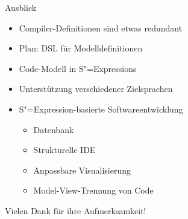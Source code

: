 \documentclass{beamer}
\newcommand{\pfeil}{\item[$\Rightarrow$]}
\newcommand{\sexp}{S"=Expression}
\newcommand{\sexps}{S"=Expressions}
\begin{document}
\begin{frame}{Ausblick}
  \begin{itemize}
  \item Compiler-Definitionen sind etwas redundant
    \pfeil Plan: DSL für Modelldefinitionen
  \item Code-Modell in \sexps{}
  \item Unterstützung verschiedener Zielsprachen
  \item \sexp{}-basierte Softwareentwicklung
    \begin{itemize}
    \item Datenbank
    \item Strukturelle IDE
    \item Anpassbare Visualisierung
    \pfeil Model-View-Trennung von Code
    \end{itemize}
  \end{itemize}
\end{frame}

\begin{frame}
  \begin{center}
    \Huge Vielen Dank für ihre Aufmerksamkeit!
  \end{center}
\end{frame}
\end{document}
